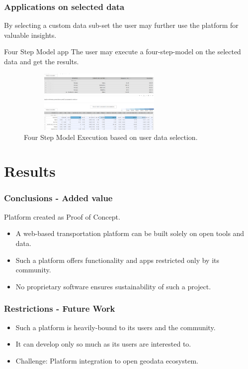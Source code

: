 \documentclass{beamer}
\begin{document}
    \begin{frame}
    \frametitle{Applications on selected data}
    By selecting a custom data sub-set the user may further use the platform for valuable insights.
    
    \begin{exampleblock}{Four Step Model app}
	    The user may execute a four-step-model on the selected data and get the results.
	\end{exampleblock}
	
	\begin{figure}[h]
    \centering
    \includegraphics[width=8cm, height=3cm]{08_4sm}
    \caption{Four Step Model Execution based on user data selection.}
    \label{fig:4sm}
    \end{figure}
    
    \end{frame}

\section{Results}

	\begin{frame}
    \frametitle{Conclusions - Added value}
    Platform created as Proof of Concept.
    \begin{itemize}
        \item A web-based transportation platform can be built solely on open tools and data.
        \item Such a platform offers functionality and apps restricted only by its community.
        \item No proprietary software ensures sustainability of such a project.
    \end{itemize}
    
    \end{frame}
    
    \begin{frame}
    \frametitle{Restrictions - Future Work}
    \begin{itemize}
        \item Such a platform is heavily-bound to its users and the community.
        \item It can develop only so much as its users are interested to.
        \item Challenge: Platform integration to open geodata ecosystem.
    \end{itemize}
    
    \end{frame}

	
\end{document}
